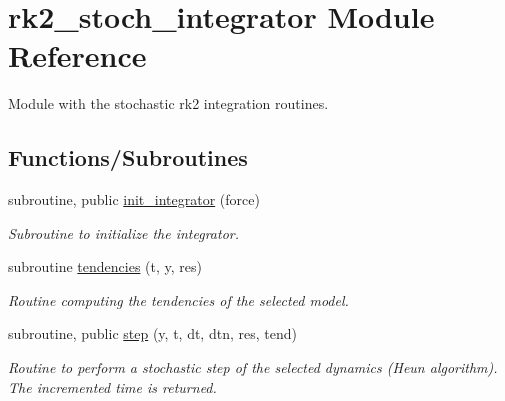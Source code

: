 \hypertarget{namespacerk2__stoch__integrator}{}\section{rk2\+\_\+stoch\+\_\+integrator Module Reference}
\label{namespacerk2__stoch__integrator}


Module with the stochastic rk2 integration routines.  


\subsection*{Functions/\+Subroutines}
\begin{DoxyCompactItemize}
\item 
subroutine, public \hyperlink{namespacerk2__stoch__integrator_af2aad21166864b46801d558106e865f5}{init\+\_\+integrator} (force)
\begin{DoxyCompactList}\small\item\em Subroutine to initialize the integrator. \end{DoxyCompactList}\item 
subroutine \hyperlink{namespacerk2__stoch__integrator_ab4478053676fb4c82516b6427ecbdb35}{tendencies} (t, y, res)
\begin{DoxyCompactList}\small\item\em Routine computing the tendencies of the selected model. \end{DoxyCompactList}\item 
subroutine, public \hyperlink{namespacerk2__stoch__integrator_a6c9446aa0badd0e16d3762e762d330d5}{step} (y, t, dt, dtn, res, tend)
\begin{DoxyCompactList}\small\item\em Routine to perform a stochastic step of the selected dynamics (Heun algorithm). The incremented time is returned. \end{DoxyCompactList}\end{DoxyCompactItemize}
